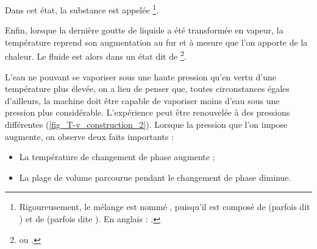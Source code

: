 		Dans cet état, la substance est appelée \footnote{Rigoureusement, le mélange est nommé , puisqu’il est composé de  (parfois dit ) et de  (parfois dite ). En anglais : .}\nolinebreak.

		Enfin, lorsque la dernière goutte de liquide a été transformée en vapeur, la température reprend son augmentation au fur et à mesure que l’on apporte de la chaleur. Le fluide est alors dans un état dit de \footnote{ ou .}\nolinebreak.%

		\clearfloats %
		L’eau ne pouvant se vaporiser sous une haute pression qu’en vertu d’une température plus élevée, on a lieu de penser que, toutes circonstances égales d’ailleurs, la machine doit être capable de vaporiser moins d’eau sous une pression plus considérable.
		L’expérience peut être renouvelée à des pressions différentes (\cref{fig_T-v_construction_2}). Lorsque la pression que l’on impose augmente, on observe deux faits importants :
		\begin{itemize}
			\item La température de changement de phase augmente ;
			\item La plage de volume parcourue pendant le changement de phase diminue.
		\end{itemize}

